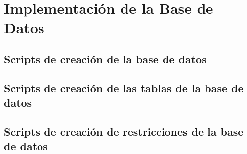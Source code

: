 \section{Implementación de la Base de Datos}

\subsection{Scripts de creación de la base de datos}

\subsection{Scripts de creación de las tablas de la base de datos}

\subsection{Scripts de creación de restricciones de la base de datos}
